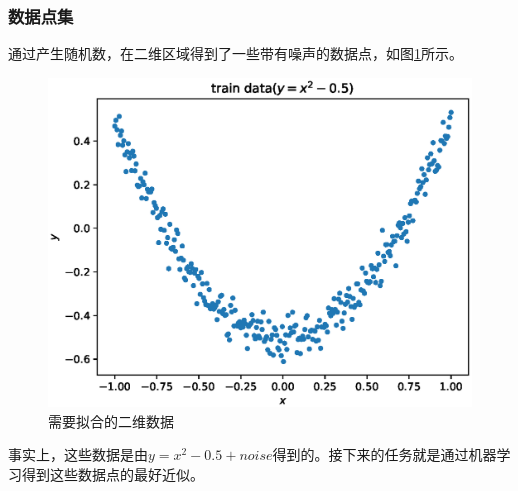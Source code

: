 \documentclass[a4paper,11pt]{ctexart}
\theoremstyle{break}
\theoremstyle{plain}
\begin{document}
\subsubsection{数据点集}
通过产生随机数，在二维区域得到了一些带有噪声的数据点，如图\ref{fig:fit_data}所示。
\begin{figure}[h]
	\centering
	\includegraphics[scale=0.6]{fiting_trian.eps}
	\caption{需要拟合的二维数据\label{fig:fit_data}}
\end{figure}
事实上，这些数据是由$y=x^2-0.5+noise$得到的。接下来的任务就是通过机器学习得到这些数据点的最好近似。
\end{document}
